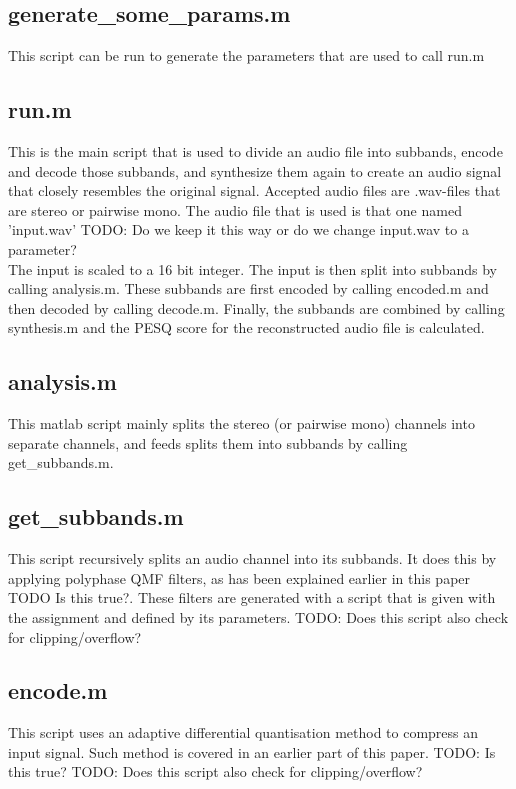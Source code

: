 \documentclass[a4paper]{article}
\begin{document}
\subsection{generate\_some\_params.m}
This script can be run to generate the parameters that are used to call run.m

\subsection{run.m}
This is the main script that is used to divide an audio file into subbands, encode and decode those subbands, and synthesize them again to create an audio signal that closely resembles the original signal. Accepted audio files are .wav-files that are stereo or pairwise mono. The audio file that is used is that one named 'input.wav' TODO: Do we keep it this way or do we change input.wav to a parameter? 
\\
The input is scaled to a 16 bit integer. The input is then split into subbands by calling analysis.m. These subbands are first encoded by calling encoded.m and then decoded by calling decode.m. Finally, the subbands are combined by calling synthesis.m and the PESQ score for the reconstructed audio file is calculated.

\subsection{analysis.m}
This matlab script mainly splits the stereo (or pairwise mono) channels into separate channels, and feeds splits them into subbands by calling get\_subbands.m.

\subsection{get\_subbands.m}
This script recursively splits an audio channel into its subbands. It does this by applying polyphase QMF filters, as has been explained earlier in this paper TODO Is this true?. These filters are generated with a script that is given with the assignment and defined by its parameters.
TODO: Does this script also check for clipping/overflow?
\subsection{encode.m}
This script uses an adaptive differential quantisation method to compress an input signal. Such method is covered in an earlier part of this paper. TODO: Is this true?
TODO: Does this script also check for clipping/overflow?
\end{document}
